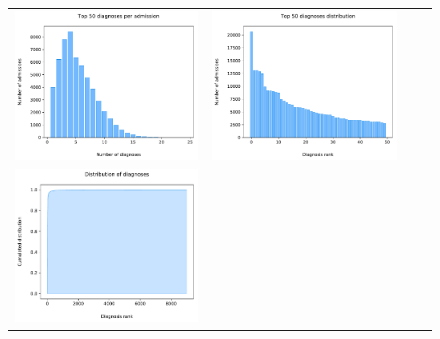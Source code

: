 \begin{figure}[H]
 \begin{tabularx}{\textwidth}{XXXX}
  \includegraphics{figures/adm-icd9.pdf} &
  \includegraphics{figures/icd9-top50.pdf} \\
  \includegraphics{figures/cdf.pdf} &

\end{tabularx}
\end{figure}
